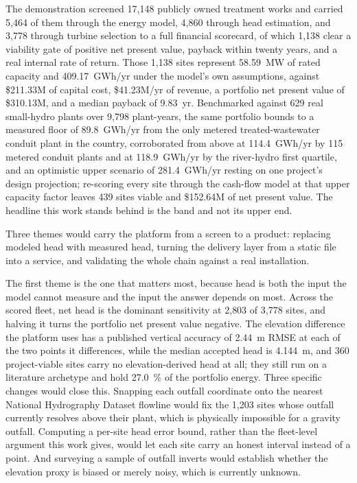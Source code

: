 \documentclass[12pt,letterpaper]{report}
\begin{document}
The demonstration screened 17{,}148 publicly owned treatment works and carried
5{,}464 of them through the energy model, 4{,}860 through head estimation, and
3{,}778 through turbine selection to a full financial scorecard, of which 1{,}138
clear a viability gate of positive net present value, payback within twenty years,
and a real internal rate of return. Those 1{,}138 sites represent 58.59~MW of
rated capacity and 409.17~GWh/yr under the model's own assumptions, against
\$211.33M of capital cost, \$41.23M/yr of revenue, a portfolio net present value
of \$310.13M, and a median payback of 9.83~yr. Benchmarked against 629 real
small-hydro plants over 9{,}798 plant-years, the same portfolio bounds to a
measured floor of 89.8~GWh/yr from the only metered treated-wastewater conduit plant in
the country, corroborated from above at 114.4~GWh/yr by 115 metered conduit plants and at
118.9~GWh/yr by the river-hydro first quartile, and an optimistic upper scenario of
281.4~GWh/yr resting on one project's design projection; re-scoring every site
through the cash-flow model at that upper capacity factor leaves 439 sites viable
and \$152.64M of net present
value. The headline this work stands behind is the band and not its upper end.

Three themes would carry the platform from a screen to a product: replacing
modeled head with measured head, turning the delivery layer from a static file
into a service, and validating the whole chain against a real installation.

The first theme is the one that matters most, because head is both the input the
model cannot measure and the input the answer depends on most. Across the scored
fleet, net head is the dominant sensitivity at 2{,}803 of 3{,}778 sites, and
halving it turns the portfolio net present value negative. The elevation
difference the platform uses has a published vertical accuracy of 2.44~m RMSE at
each of the two points it differences, while the median accepted head is 4.144~m,
and 360 project-viable sites carry no elevation-derived head at all; they still
run on a literature archetype and hold 27.0~\% of the portfolio energy. Three
specific changes would close this. Snapping each outfall coordinate onto the
nearest National Hydrography Dataset flowline would fix the 1{,}203 sites whose
outfall currently resolves above their plant, which is physically impossible for a
gravity outfall. Computing a per-site head error bound, rather than the fleet-level
argument this work gives, would let each site carry an honest interval instead of
a point. And surveying a sample of outfall inverts would establish whether the
elevation proxy is biased or merely noisy, which is currently unknown.
\end{document}

